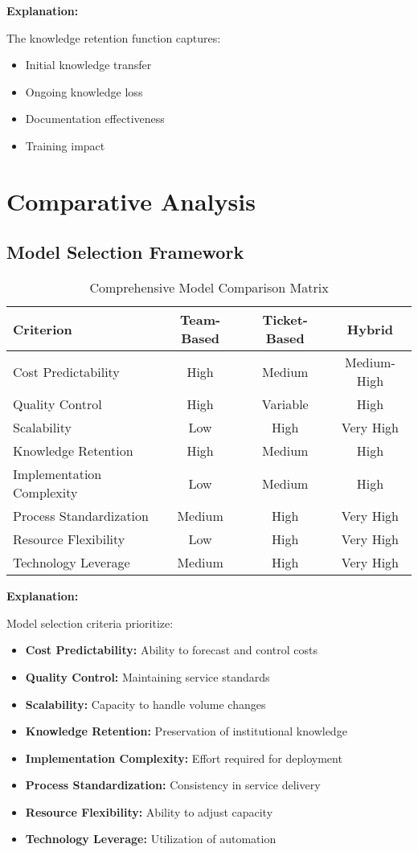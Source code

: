 \documentclass[12pt,a4paper]{article}
\newenvironment{explanation}
{\begin{mdframed}[style=explanationstyle]
\textbf{Explanation:}\par}
{\end{mdframed}}
\begin{document}
\begin{explanation}
The knowledge retention function captures:
\begin{itemize}
    \item Initial knowledge transfer
    \item Ongoing knowledge loss
    \item Documentation effectiveness
    \item Training impact
\end{itemize}
\end{explanation}

\section{Comparative Analysis}
\subsection{Model Selection Framework}
\begin{table}[H]
\centering
\begin{tabular}{@{}p{3cm}ccc@{}}
\toprule
\textbf{Criterion} & \textbf{Team-Based} & \textbf{Ticket-Based} & \textbf{Hybrid} \\
\midrule
Cost Predictability & High & Medium & Medium-High \\
Quality Control & High & Variable & High \\
Scalability & Low & High & Very High \\
Knowledge Retention & High & Medium & High \\
Implementation Complexity & Low & Medium & High \\
Process Standardization & Medium & High & Very High \\
Resource Flexibility & Low & High & Very High \\
Technology Leverage & Medium & High & Very High \\
\bottomrule
\end{tabular}
\caption{Comprehensive Model Comparison Matrix}
\label{tab:model-comparison}
\end{table}

\begin{explanation}
Model selection criteria prioritize:
\begin{itemize}
    \item \textbf{Cost Predictability:} Ability to forecast and control costs
    \item \textbf{Quality Control:} Maintaining service standards
    \item \textbf{Scalability:} Capacity to handle volume changes
    \item \textbf{Knowledge Retention:} Preservation of institutional knowledge
    \item \textbf{Implementation Complexity:} Effort required for deployment
    \item \textbf{Process Standardization:} Consistency in service delivery
    \item \textbf{Resource Flexibility:} Ability to adjust capacity
    \item \textbf{Technology Leverage:} Utilization of automation
\end{itemize}
\end{explanation}
\end{document}
